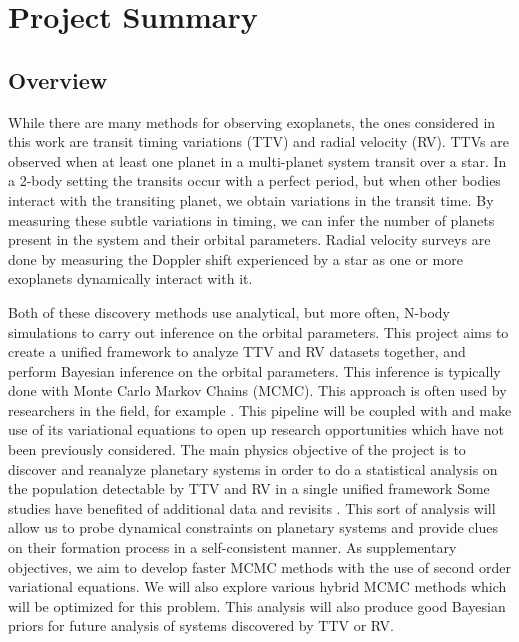 \section{Project Summary}
\subsection{Overview}
While there are many methods for observing exoplanets, the ones considered in this work are transit timing variations (TTV) and radial velocity (RV). 
TTVs are observed when at least one planet in a multi-planet system transit over a star. 
In a 2-body setting the transits occur with a perfect period, but when other bodies interact with the transiting planet, we obtain variations in the transit time.
By measuring these subtle variations in timing, we can infer the number of planets present in the system and their orbital parameters.
Radial velocity surveys are done by measuring the Doppler shift experienced by a star as one or more exoplanets dynamically interact with it.


Both of these discovery methods use analytical, but more often, N-body simulations to carry out inference on the orbital parameters.
This project aims to create a unified framework to analyze TTV and RV datasets together, and perform Bayesian inference on the orbital parameters.
This inference is typically done with Monte Carlo Markov Chains (MCMC).
This approach is often used by researchers in the field, for example \cite{1707.04962, raetz2015wasp}.
This pipeline will be coupled with \reb and make use of its variational equations to open up research opportunities which have not been previously considered.
The main physics objective of the project is to discover and reanalyze planetary systems in order to do a statistical analysis on the population detectable by TTV and RV in a single unified framework 
Some studies have benefited of additional data and revisits \cite{1704.04290}.
This sort of analysis will allow us to probe dynamical constraints on planetary systems and provide clues on their formation process in a self-consistent manner.
As supplementary objectives, we aim to develop faster MCMC methods with the use of second order variational equations.
We will also explore various hybrid MCMC methods which will be optimized for this problem.
This analysis will also produce good Bayesian priors for future analysis of systems discovered by TTV or RV.


